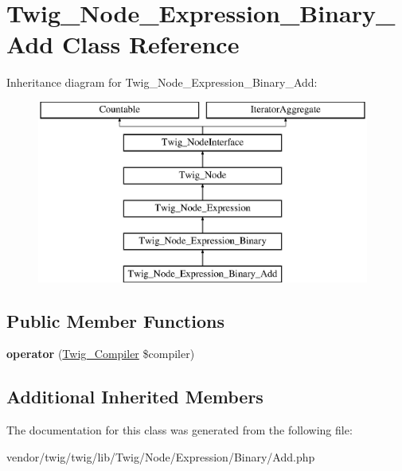 \hypertarget{classTwig__Node__Expression__Binary__Add}{}\section{Twig\+\_\+\+Node\+\_\+\+Expression\+\_\+\+Binary\+\_\+\+Add Class Reference}
\label{classTwig__Node__Expression__Binary__Add}
Inheritance diagram for Twig\+\_\+\+Node\+\_\+\+Expression\+\_\+\+Binary\+\_\+\+Add\+:\begin{figure}[H]
\begin{center}
\leavevmode
\includegraphics[height=6.000000cm]{classTwig__Node__Expression__Binary__Add}
\end{center}
\end{figure}
\subsection*{Public Member Functions}
\begin{DoxyCompactItemize}
\item 
{\bfseries operator} (\hyperlink{classTwig__Compiler}{Twig\+\_\+\+Compiler} \$compiler)\hypertarget{classTwig__Node__Expression__Binary__Add_a9973c9c483b04eecf7ab0e65bf663f71}{}\label{classTwig__Node__Expression__Binary__Add_a9973c9c483b04eecf7ab0e65bf663f71}

\end{DoxyCompactItemize}
\subsection*{Additional Inherited Members}


The documentation for this class was generated from the following file\+:\begin{DoxyCompactItemize}
\item 
vendor/twig/twig/lib/\+Twig/\+Node/\+Expression/\+Binary/Add.\+php\end{DoxyCompactItemize}

